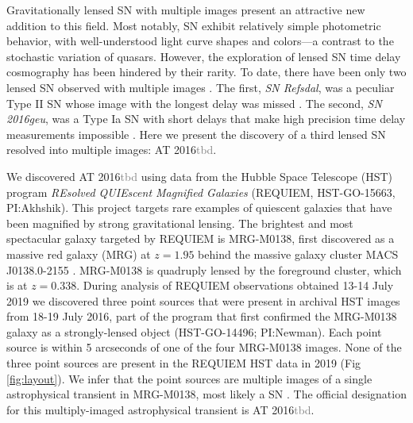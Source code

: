 \documentclass[12pt,dvipsnames]{article}
\def\SNABC{AT 2016{\textcolor{Gray}{tbd}}\xspace}
\begin{document}
Gravitationally lensed SN with multiple images present an attractive new addition to this field. Most notably, SN exhibit relatively simple photometric behavior, with well-understood light curve shapes and colors---a contrast to the stochastic variation of quasars.  However, the exploration of lensed SN time delay cosmography has been hindered by their rarity.  To date, there have been only two lensed SN observed with multiple images \cite{kelly_multiple_2015,goobar_iptf16geu:_2017}. The first, {\it SN Refsdal}, was a peculiar Type II SN whose image with the longest delay was missed \cite{kelly_sn_2016}. The second, {\it SN 2016geu}, was a Type Ia SN with short delays that make high precision time delay measurements impossible \cite{dhawan_magnification_2019}. Here we present the discovery 
of a third lensed SN resolved into multiple images: \SNABC. 

We discovered \SNABC using data from the Hubble Space Telescope (HST) program {\it REsolved QUIEscent Magnified Galaxies} (REQUIEM, HST-GO-15663, PI:Akhshik). This project targets rare examples of quiescent galaxies that have been magnified by strong gravitational lensing. %
The brightest and most spectacular galaxy targeted by REQUIEM
is MRG-M0138, first discovered as a massive red galaxy (MRG) at $z=1.95$ \cite{newman_resolving_2018} behind the massive galaxy cluster MACS J0138.0-2155 \cite{ebeling_macs_2001}.
MRG-M0138 is quadruply lensed by the foreground cluster, which is at $z=0.338$.  
During analysis of REQUIEM observations obtained 13-14 July 2019 \cite{materials_methods_2020} we discovered three point 
sources that were present in archival HST images from 18-19 July 2016, part of the program 
that first confirmed the MRG-M0138 galaxy as a strongly-lensed object (HST-GO-14496; PI:Newman). 
Each point source is within 5 arcseconds of one of the four MRG-M0138 images.  None of the
three point sources are present in the REQUIEM HST data in 2019 (Fig \ref{fig:layout}). We infer that 
the point sources are multiple images of a single astrophysical 
transient in MRG-M0138, most likely a SN \cite{materials_methods_2020}.  
The official designation for this multiply-imaged astrophysical transient is \SNABC.
\end{document}
